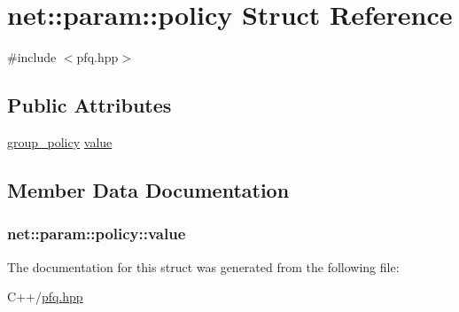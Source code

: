 \hypertarget{structnet_1_1param_1_1policy}{\section{net\+:\+:param\+:\+:policy Struct Reference}
\label{structnet_1_1param_1_1policy}
}


{\ttfamily \#include $<$pfq.\+hpp$>$}

\subsection*{Public Attributes}
\begin{DoxyCompactItemize}
\item 
\hyperlink{namespacenet_aedc1a0dde937ddbd0800af02920b1067}{group\+\_\+policy} \hyperlink{structnet_1_1param_1_1policy_abc94abaa3c703a34753cd42f435d03f6}{value}
\end{DoxyCompactItemize}


\subsection{Member Data Documentation}
\hypertarget{structnet_1_1param_1_1policy_abc94abaa3c703a34753cd42f435d03f6}{
\subsubsection[{value}]{ net\+::param\+::policy\+::value}}\label{structnet_1_1param_1_1policy_abc94abaa3c703a34753cd42f435d03f6}


The documentation for this struct was generated from the following file\+:\begin{DoxyCompactItemize}
\item 
C++/\hyperlink{pfq_8hpp}{pfq.\+hpp}\end{DoxyCompactItemize}
